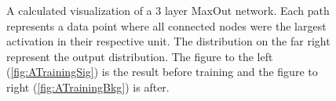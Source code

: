 \begin{figure}
{\begin{subfigure}{.6\textwidth}
        \caption{}
        \label{fig:ATraining}
    \end{subfigure}
    }
    \caption[A calculated visualization of the activation of a 3 layer MaxOut network, before and after training.]{
    A calculated visualization of a 3 layer MaxOut network. Each path 
    represents a data point where all connected nodes were the largest activation in their respective 
    unit. The distribution on the far right represent the output distribution. The figure to the left
    (\ref{fig:ATrainingSig}) is the result before training and the figure to right (\ref{fig:ATrainingBkg})
    is after.}
\end{figure}


\begin{figure}
\end{figure}
